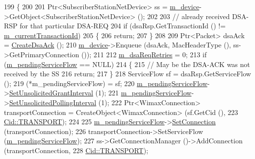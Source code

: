 \begin{DoxyCode}
199 \{
200 
201   Ptr<SubscriberStationNetDevice> ss = \hyperlink{classns3_1_1SsServiceFlowManager_a8b8a4279e4e039ac2eaeb8d051792441}{m\_device}->GetObject<SubscriberStationNetDevice> ();
202 
203   \textcolor{comment}{// already received DSA-RSP for that particular DSA-REQ}
204   \textcolor{keywordflow}{if} (dsaRsp.GetTransactionId () != \hyperlink{classns3_1_1SsServiceFlowManager_a0e72fbf3a59c7e080f3b4b5bd709f595}{m\_currentTransactionId})
205     \{
206       \textcolor{keywordflow}{return};
207     \}
208 
209   Ptr<Packet> dsaAck = \hyperlink{classns3_1_1SsServiceFlowManager_aa1284d53599ef6f1c4ba3f7dd3ac8f09}{CreateDsaAck} ();
210   \hyperlink{classns3_1_1SsServiceFlowManager_a8b8a4279e4e039ac2eaeb8d051792441}{m\_device}->Enqueue (dsaAck, MacHeaderType (), ss->GetPrimaryConnection ());
211 
212   \hyperlink{classns3_1_1SsServiceFlowManager_a34c992ad355e2127c4377a62543208d8}{m\_dsaReqRetries} = 0;
213   \textcolor{keywordflow}{if} (\hyperlink{classns3_1_1SsServiceFlowManager_a3d0897d17b8b4d7fcd703851c6233bbe}{m\_pendingServiceFlow} == NULL)
214     \{
215       \textcolor{comment}{// May be the DSA-ACK was not received by the SS}
216       \textcolor{keywordflow}{return};
217     \}
218   ServiceFlow sf = dsaRsp.GetServiceFlow ();
219   (*m\_pendingServiceFlow) = sf;
220   \hyperlink{classns3_1_1SsServiceFlowManager_a3d0897d17b8b4d7fcd703851c6233bbe}{m\_pendingServiceFlow}->\hyperlink{classns3_1_1ServiceFlow_ac24ac69794285436be39a2e4aef7b805}{SetUnsolicitedGrantInterval} (1);
221   \hyperlink{classns3_1_1SsServiceFlowManager_a3d0897d17b8b4d7fcd703851c6233bbe}{m\_pendingServiceFlow}->\hyperlink{classns3_1_1ServiceFlow_ad365ab6833fa3fd889946b4022cc4427}{SetUnsolicitedPollingInterval} (1);
222   Ptr<WimaxConnection> transportConnection = CreateObject<WimaxConnection> (sf.GetCid (),
223                                                                             
      \hyperlink{classns3_1_1Cid_a10b8f92080ca5790e65a0bfa2f557e0aa46fbed56841c3bf471aa84de022edf87}{Cid::TRANSPORT});
224 
225   \hyperlink{classns3_1_1SsServiceFlowManager_a3d0897d17b8b4d7fcd703851c6233bbe}{m\_pendingServiceFlow}->\hyperlink{classns3_1_1ServiceFlow_af7ee28190978c72871a7227cc62807dc}{SetConnection} (transportConnection);
226   transportConnection->SetServiceFlow (\hyperlink{classns3_1_1SsServiceFlowManager_a3d0897d17b8b4d7fcd703851c6233bbe}{m\_pendingServiceFlow});
227   ss->GetConnectionManager ()->AddConnection (transportConnection,
228                                               \hyperlink{classns3_1_1Cid_a10b8f92080ca5790e65a0bfa2f557e0aa46fbed56841c3bf471aa84de022edf87}{Cid::TRANSPORT});

\end{DoxyCode}
